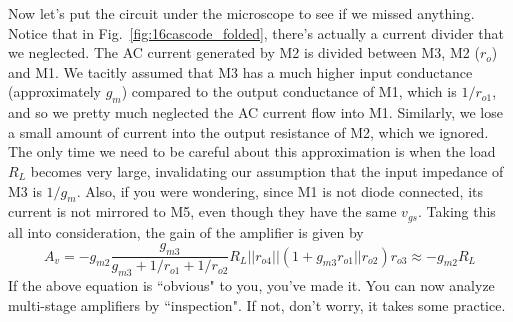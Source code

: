 Now let's put the circuit under the microscope to see if we missed anything.  Notice that in Fig.~\ref{fig:16cascode_folded}, there's actually a current divider that we neglected.  The AC current generated by M2 is divided between M3, M2 ($r_o$) and M1.  We tacitly assumed that M3 has a much higher input conductance (approximately $g_m$) compared to the output conductance of M1, which is $1/r_{o1}$, and so we pretty much neglected the AC current flow into M1.  Similarly, we lose a small amount of current into the output resistance of M2, which we ignored.  The only time we need to be careful about this approximation is when the load $R_L$ becomes very large, invalidating our assumption that the input impedance of M3 is $1/g_m$.  Also, if you were wondering, since M1 is not diode connected, its current is not mirrored to M5, even though they have the same $v_{gs}$.  Taking this all into consideration, the gain of the amplifier is given by
%
\begin{equation}
	A_v = - g_{m2} \frac{g_{m3}}{g_{m3} + 1/r_{o1} + 1/r_{o2}} R_L || r_{o4} || (1 + g_{m3} r_{o1}||r_{o2} ) r_{o3}  \approx -g_{m2} R_L
\end{equation} 
%
If the above equation is ``obvious" to you, you've made it.  You can now analyze multi-stage amplifiers by ``inspection".  If not, don't worry, it takes some practice.

